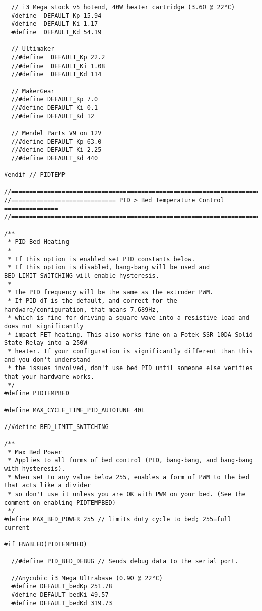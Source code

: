 \begin{lstlisting}
  // i3 Mega stock v5 hotend, 40W heater cartridge (3.6Ω @ 22°C)
  #define  DEFAULT_Kp 15.94
  #define  DEFAULT_Ki 1.17
  #define  DEFAULT_Kd 54.19

  // Ultimaker
  //#define  DEFAULT_Kp 22.2
  //#define  DEFAULT_Ki 1.08
  //#define  DEFAULT_Kd 114

  // MakerGear
  //#define DEFAULT_Kp 7.0
  //#define DEFAULT_Ki 0.1
  //#define DEFAULT_Kd 12

  // Mendel Parts V9 on 12V
  //#define DEFAULT_Kp 63.0
  //#define DEFAULT_Ki 2.25
  //#define DEFAULT_Kd 440

#endif // PIDTEMP

//===========================================================================
//============================= PID > Bed Temperature Control ===============
//===========================================================================

/**
 * PID Bed Heating
 *
 * If this option is enabled set PID constants below.
 * If this option is disabled, bang-bang will be used and BED_LIMIT_SWITCHING will enable hysteresis.
 *
 * The PID frequency will be the same as the extruder PWM.
 * If PID_dT is the default, and correct for the hardware/configuration, that means 7.689Hz,
 * which is fine for driving a square wave into a resistive load and does not significantly
 * impact FET heating. This also works fine on a Fotek SSR-10DA Solid State Relay into a 250W
 * heater. If your configuration is significantly different than this and you don't understand
 * the issues involved, don't use bed PID until someone else verifies that your hardware works.
 */
#define PIDTEMPBED

#define MAX_CYCLE_TIME_PID_AUTOTUNE 40L

//#define BED_LIMIT_SWITCHING

/**
 * Max Bed Power
 * Applies to all forms of bed control (PID, bang-bang, and bang-bang with hysteresis).
 * When set to any value below 255, enables a form of PWM to the bed that acts like a divider
 * so don't use it unless you are OK with PWM on your bed. (See the comment on enabling PIDTEMPBED)
 */
#define MAX_BED_POWER 255 // limits duty cycle to bed; 255=full current

#if ENABLED(PIDTEMPBED)

  //#define PID_BED_DEBUG // Sends debug data to the serial port.

  //Anycubic i3 Mega Ultrabase (0.9Ω @ 22°C)
  #define DEFAULT_bedKp 251.78
  #define DEFAULT_bedKi 49.57
  #define DEFAULT_bedKd 319.73


\end{lstlisting}
